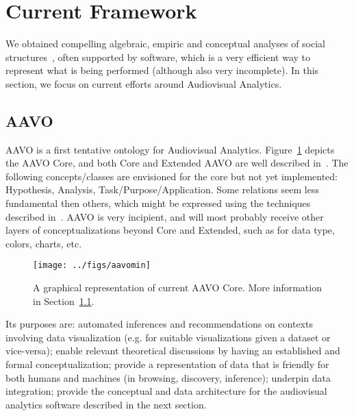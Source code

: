 \documentclass[letterpaper,10pt]{article}
\begin{document}
\section{Current Framework}\label{current}
We obtained compelling algebraic, empiric and conceptual
analyses of social structures~\cite{tese,stab},
often supported by software, which is a very efficient
way to represent
what is being performed (although also very incomplete).
In this section, we focus on current efforts around Audiovisual Analytics.

\subsection{AAVO}\label{sec:aavo}
AAVO is a first tentative ontology for Audiovisual Analytics.
Figure~\ref{aavo} depicts the AAVO Core,
and both Core and Extended AAVO are well described in~\cite{aavo}.
The following concepts/classes are envisioned for the core
but not yet implemented:
Hypothesis, Analysis, Task/Purpose/Application.
Some relations seem less fundamental then others,
which might be expressed using the techniques described
in~\cite{ont}.
AAVO is very incipient, and will most probably receive
other layers of conceptualizations beyond Core and Extended,
such as for data type, colors, charts, etc.

\begin{figure}[htbp]
  \centering
  \texttt{[image: ../figs/aavomin]}
\caption{A graphical representation of current AAVO Core.
	More information in Section~\ref{sec:aavo}.}\label{aavo}
\end{figure}

Its purposes are: automated inferences and recommendations on
contexts involving data visualization (e.g. for suitable visualizations given a
dataset or vice-versa);
enable relevant theoretical discussions by having an
established and formal conceptualization;
provide a representation of data that is friendly for
both humans and machines (in browsing, discovery, inference);
underpin data integration;
provide the conceptual and data architecture for
the audiovisual analytics software described in
the next section.
\end{document}
